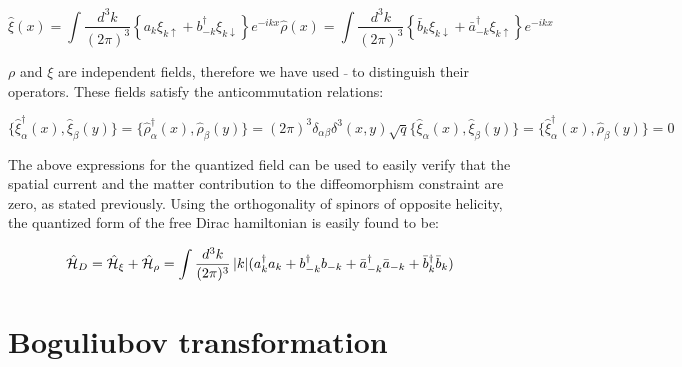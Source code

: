 \begin{doublespace}
\begin{subequations}\label{QuantizedFermionField}
\begin{equation}
    \hat\xi(x) = \int \frac{d^3k}{(2\pi)^3} \left\{ a_k \xi_{k\uparrow} + b^\dag_{-k} \xi_{k\downarrow} \right\} e^{-ikx}
\end{equation}
\begin{equation}
    \hat\rho(x) = \int \frac{d^3k}{(2\pi)^3} \left\{ \bar b_k \xi_{k\downarrow} + \bar a^\dag_{-k} \xi_{k\uparrow} \right\}e^{-ikx}
\end{equation}
\end{subequations}

$\rho$ and $\xi$ are independent fields, therefore we have used $\bar{}$ to distinguish their
operators. These fields satisfy the anticommutation relations:

\begin{subequations}\label{Anticommutation}
\begin{equation}
    \{\hat\xi^\dag_\alpha(x),\hat\xi_\beta(y)\} = \{\hat\rho^\dag_\alpha(x),\hat\rho_\beta(y)\} =
    (2\pi)^3\delta_{\alpha\beta}\delta^3(x,y)\sqrt{q}
\end{equation}
\begin{equation}
    \{\hat\xi_\alpha(x),\hat\xi_\beta(y)\} = \{\hat\xi^\dag_\alpha(x),\hat\rho_\beta(y)\} = 0
\end{equation}
\end{subequations}


The above expressions for the quantized field can be used to easily verify that the spatial current
and the matter contribution to the diffeomorphism constraint are zero, as stated previously. Using
the orthogonality of spinors of opposite helicity, the quantized form of the free Dirac hamiltonian
is easily found to be:

\begin{equation}\label{QuantizedDiracHam}
    \hat{\cal H}_D = \hat{\cal H}_\xi + \hat{\cal H}_\rho = \int \frac{d^3k}{(2\pi)^3}\,|k|
            (a^\dag_k a_k + b^\dag_{-k} b_{-k} + \bar a^\dag_{-k} \bar a_{-k} + \bar b^\dag_k \bar b_k)
\end{equation}

\section{Boguliubov transformation}


\end{doublespace}
